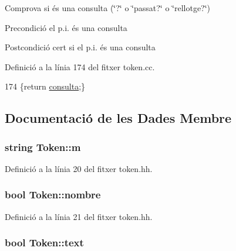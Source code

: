 Comprova si és una consulta (\char`\"{}?\char`\"{} o \char`\"{}passat?\char`\"{} o \char`\"{}rellotge?\char`\"{}) 

\begin{DoxyPrecond}{Precondició}
el p.\-i. és una consulta 
\end{DoxyPrecond}
\begin{DoxyPostcond}{Postcondició}
cert si el p.\-i. és una consulta 
\end{DoxyPostcond}


Definició a la línia 174 del fitxer token.\-cc.


\begin{DoxyCode}
174 \{\textcolor{keywordflow}{return} \hyperlink{class_token_a4479e876476db5ccd360ad3906d47eff}{consulta};\}
\end{DoxyCode}


\subsection{Documentació de les Dades Membre}
\hypertarget{class_token_a7ebc9777007c54f9a83d6197f3023d07}{
\subsubsection[{m}]{\setlength{\rightskip}{0pt plus 5cm}string Token\-::m\hspace{0.3cm}{\ttfamily [private]}}}\label{class_token_a7ebc9777007c54f9a83d6197f3023d07}


Definició a la línia 20 del fitxer token.\-hh.

\hypertarget{class_token_a3f8dba2b14d4e7b8d77ea608c286e62f}{
\subsubsection[{nombre}]{\setlength{\rightskip}{0pt plus 5cm}bool Token\-::nombre\hspace{0.3cm}{\ttfamily [private]}}}\label{class_token_a3f8dba2b14d4e7b8d77ea608c286e62f}


Definició a la línia 21 del fitxer token.\-hh.

\hypertarget{class_token_ad1f7addc8379df272399a71189a3d234}{
\subsubsection[{text}]{\setlength{\rightskip}{0pt plus 5cm}bool Token\-::text\hspace{0.3cm}{\ttfamily [private]}}}\label{class_token_ad1f7addc8379df272399a71189a3d234}


